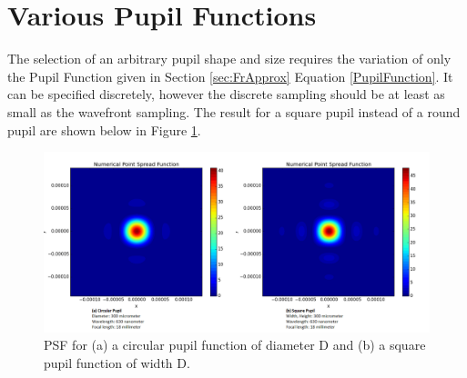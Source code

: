 \section{Various Pupil Functions}

The selection of an arbitrary pupil shape and size requires the variation of only the Pupil Function given in Section \ref{sec:FrApprox} Equation \ref{PupilFunction}.  It can be specified discretely, however the discrete sampling should be at least as small as the wavefront sampling.  The result for a square pupil instead of a round pupil are shown below in Figure \ref{fig:Pupils}.

\begin{figure}[H]
	\centering
		\includegraphics[width=1.0\textwidth]{figures/PupilShape.png}
	\caption{PSF for (a) a circular pupil function of diameter D and (b) a square pupil function of width D. }
	\label{fig:Pupils}
\end{figure}
